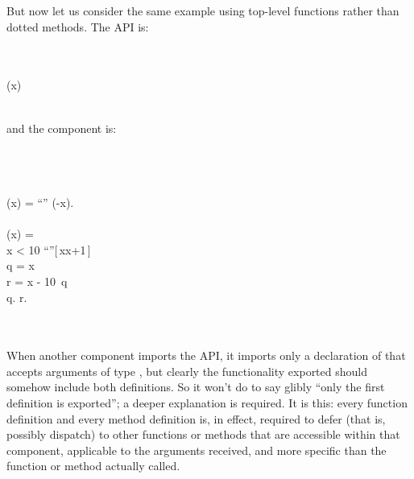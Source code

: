 But now let us consider the same example using top-level
functions rather than dotted methods.  The API is:
\begin{codeexamplesize}
\begin{FortressCode}
  \\
 \\
(x\COLON {})\COLON {} \\
 \\
 
\end{FortressCode}
\end{codeexamplesize}
and the component is:
\begin{codeexamplesize}
\begin{FortressCode}
  \\
  \\
 \\
(x\COLON {}) = \hbox{\rm{}``\STR{{-}}''} \mathrel{\Vert} (-x). \\
 \\
(x\COLON {}) = \\
\2\+ x < 10  \hbox{\rm{}``''}[\,x\COLONOP{}x+1\,]  \\
  \2\+q = x  \\
    r = x - 10\, q \\
    q. \mathrel{\Vert} r.\- \\
   \\
\- \\
 
\end{FortressCode}
\end{codeexamplesize}
When another component imports the API, it imports
only a declaration of  that accepts arguments
of type , but clearly the functionality
exported should somehow include both definitions.
So it won't do to say glibly ``only the first definition
is exported''; a deeper explanation is required.
It is this: every function definition and every method definition is, in effect,
required to defer (that is, possibly dispatch) to other functions or methods
that are accessible within that component, applicable to the arguments received,
and more specific than the function or method actually called.

